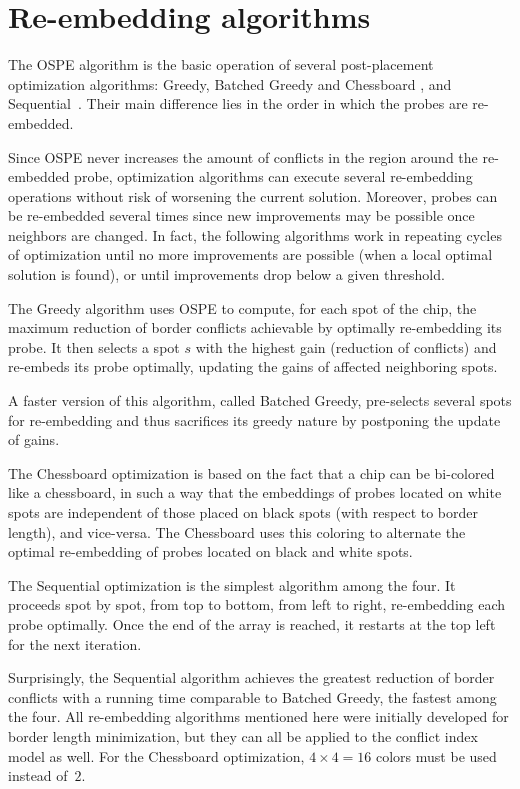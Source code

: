 \section{Re-embedding algorithms}
\label{sec:reembed_alg}

The OSPE algorithm is the basic operation of several post-placement
optimization algorithms: Greedy, Batched Greedy and Chessboard
\citep{Kahng2002}, and Sequential~\citep{Kahng2003a}. Their main difference
lies in the order in which the probes are re-embedded.

Since OSPE never increases the amount of conflicts in the region
around the re-embedded probe, optimization algorithms can execute
several re-embedding operations without risk of worsening the current
solution. Moreover, probes can be re-embedded several times since new
improvements may be possible once neighbors are changed.
In fact, the following
algorithms work in repeating cycles of optimization until no more
improvements are possible (when a local optimal solution is found), or
until improvements drop below a given threshold.
  
The Greedy algorithm uses OSPE to compute, for each spot of the chip,
the maximum reduction of border conflicts achievable by optimally
re-embedding its probe. It then selects a spot $s$ with the highest
gain (reduction of conflicts) and re-embeds its probe optimally,
updating the gains of affected neighboring spots.

A faster version of this algorithm, called Batched Greedy, pre-selects
several spots for re-embedding and thus sacrifices its greedy nature
by postponing the update of gains.

The Chessboard optimization is based on the fact that a chip can be bi-colored
like a chessboard, in such a way that the embeddings of probes located on
white spots are independent of those placed on black spots (with respect to
border length), and vice-versa. The Chessboard uses this coloring to alternate
the optimal re-embedding of probes located on black and white spots.

The Sequential optimization is the simplest algorithm among the four.
It proceeds spot by spot, from top to bottom, from left to right,
re-embedding each probe optimally. Once the end of the array is
reached, it restarts at the top left for the next iteration.

Surprisingly, the Sequential algorithm achieves the greatest reduction
of border conflicts with a running time comparable to Batched Greedy,
the fastest among the four.  All re-embedding algorithms mentioned
here were initially developed for border length minimization, but they
can all be applied to the conflict index model as well. For the
Chessboard optimization, $4\times 4=16$ colors must be used
instead of~$2$.
